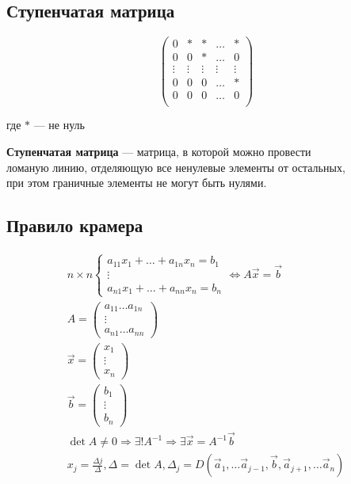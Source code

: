 \documentclass{article}
\begin{document}
\subsection{Ступенчатая матрица}

\[
\begin{pmatrix}
	0 & * & * & \dots & * \\
	0 & 0 & * & \dots & 0 \\
	\vdots & \vdots & \vdots & \vdots & \vdots \\
	0 & 0 & 0 & \dots & * \\
	0 & 0 & 0 & \dots & 0 \\
\end{pmatrix}
\]

где $*$ --- не нуль

\textbf{Ступенчатая матрица} --- матрица, в которой можно провести \\
ломаную линию, отделяющую все ненулевые элементы от остальных, \\
при этом граничные элементы не могут быть нулями.

\subsection{Правило крамера}

\begin{gather*}
	n \times n \begin{cases}
		a_{11} x_1 + \dots + a_{1n} x_n = b_1 \\
		\vdots \\
		a_{n1} x_1 + \dots + a_{nn} x_n = b_n
	\end{cases}
	\Leftrightarrow
	A \vec{x} = \vec{b} \\
	A = \begin{pmatrix}
		a_{11} \dots a_{1n} \\
		\vdots \\
		a_{n1} \dots a_{nn}
	\end{pmatrix} \\
	\vec{x} = \begin{pmatrix}
		x_1 \\
		\vdots \\
		x_n
	\end{pmatrix} \\
	\vec{b} = \begin{pmatrix}
		b_1 \\
		\vdots \\
		b_n
	\end{pmatrix} \\
	\det A \ne 0 \Rightarrow \exists ! A^{-1} \Rightarrow \exists \vec{x} = A^{-1} \vec{b} \\
	x_j = \frac{\Delta j}{\Delta}, \Delta = \det A, \Delta_j = D(\vec{a}_1, \dots \vec{a}_{j - 1}, \vec{b}, \vec{a}_{j + 1}, \dots \vec{a}_n)
\end{gather*}
\end{document}
